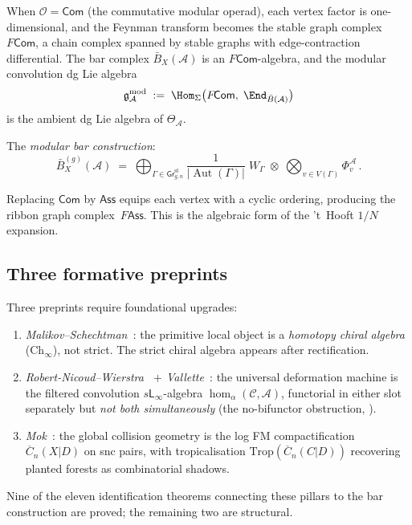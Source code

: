 \documentclass[11pt]{report}
\theoremstyle{definition}
\theoremstyle{remark}
\providecommand{\cA}{\mathcal{A}}
\providecommand{\cC}{\mathcal{C}}
\providecommand{\cO}{\mathcal{O}}
\providecommand{\barB}{\bar{B}}
\providecommand{\FM}{\overline{C}}
\numberwithin{equation}{section}
\begin{document}
When $\cO = \mathsf{Com}$ (the commutative modular operad), each vertex factor is one-dimensional, and the Feynman transform becomes the stable graph complex $F\!\mathsf{Com}$, a chain complex spanned by stable graphs with edge-contraction differential. The bar complex $\barB_X(\cA)$ is an $F\!\mathsf{Com}$-algebra, and the modular convolution dg Lie algebra
\begin{equation}\label{eq:intro-gmod}
\mathfrak{g}^{\mathrm{mod}}_\cA
\;:=\;
\Hom_\Sigma\bigl(F\!\mathsf{Com},\;\End_{\barB(\cA)}\bigr)
\end{equation}
is the ambient dg Lie algebra of $\Theta_\cA$.

The \emph{modular bar construction}:
\begin{equation}\label{eq:intro-modular-bar}
\barB^{(g)}_X(\cA)
\;=\;
\bigoplus_{\Gamma\in\mathsf{Gr}^{\mathrm{st}}_{g,n}}
\frac{1}{|\operatorname{Aut}(\Gamma)|}
\;W_\Gamma\;\otimes\;
\bigotimes_{v\in V(\Gamma)}\Phi_v^\cA\,.
\end{equation}

Replacing $\mathsf{Com}$ by $\mathsf{Ass}$ equips each vertex with a cyclic ordering, producing the ribbon graph complex~$F\!\mathsf{Ass}$. This is the algebraic form of the 't~Hooft $1/N$ expansion.

\subsection{Three formative preprints}

Three preprints require foundational upgrades:
\begin{enumerate}[label=(\Alph*),nosep]
\item \emph{Malikov--Schechtman~\cite{MS24}}: the primitive local object is a \emph{homotopy chiral algebra} ($\mathrm{Ch}_\infty$), not strict. The strict chiral algebra appears after rectification.
\item \emph{Robert-Nicoud--Wierstra~\cite{RNW19} $+$ Vallette~\cite{Val16}}: the universal deformation machine is the filtered convolution $s\mathsf{L}_\infty$-algebra $\hom_\alpha(\cC, \cA)$, functorial in either slot separately but \emph{not both simultaneously} (the no-bifunctor obstruction, \cite[Theorem~6.6]{RNW19}).
\item \emph{Mok~\cite{Mok25}}: the global collision geometry is the log FM compactification $\FM_n(X|D)$ on snc pairs, with tropicalisation $\mathrm{Trop}(\FM_n(C|D))$ recovering planted forests as combinatorial shadows.
\end{enumerate}
Nine of the eleven identification theorems connecting these pillars to the bar construction are proved; the remaining two are structural.
\end{document}
